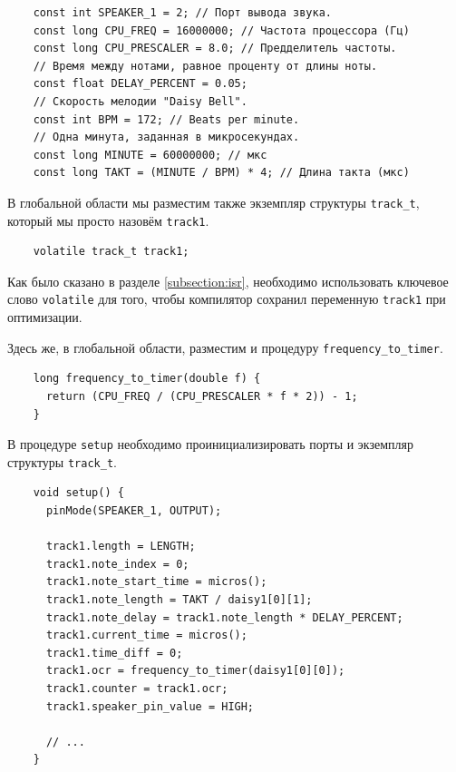 \documentclass[../sparc.tex]{subfiles}
\begin{document}
\begin{listing}[H]
  \begin{verbatim}
    const int SPEAKER_1 = 2; // Порт вывода звука.
    const long CPU_FREQ = 16000000; // Частота процессора (Гц)
    const long CPU_PRESCALER = 8.0; // Предделитель частоты.
    // Время между нотами, равное проценту от длины ноты.
    const float DELAY_PERCENT = 0.05;
    // Скорость мелодии "Daisy Bell".
    const int BPM = 172; // Beats per minute.
    // Одна минута, заданная в микросекундах.
    const long MINUTE = 60000000; // мкс
    const long TAKT = (MINUTE / BPM) * 4; // Длина такта (мкс)
  \end{verbatim}
  \caption{Константы, необходимые для генерации мелодии.}
  \label{listing:mcu-music-4}
\end{listing}

В глобальной области мы разместим также экземпляр структуры
\texttt{track_t}, который мы просто назовём \texttt{track1}.

\begin{listing}[H]
  \begin{verbatim}
    volatile track_t track1;
  \end{verbatim}
  \caption{Создание экземпляра структуры \texttt{track_t}.}
  \label{listing:mcu-music-5}
\end{listing}

Как было сказано в разделе \ref{subsection:isr}, необходимо использовать
ключевое слово \texttt{volatile} для того, чтобы компилятор сохранил
переменную \texttt{track1} при оптимизации.

Здесь же, в глобальной области, разместим и процедуру
\texttt{frequency_to_timer}.

\begin{listing}[H]
  \begin{verbatim}
    long frequency_to_timer(double f) {
      return (CPU_FREQ / (CPU_PRESCALER * f * 2)) - 1;
    }
  \end{verbatim}
  \caption{Процедура для преобразования частоты звука в значение регистра
    сравнения ``OCR''.}
  \label{listing:mcu-music-6}
\end{listing}

В процедуре \texttt{setup} необходимо проинициализировать порты и
экземпляр структуры \texttt{track_t}.

\begin{listing}[H]
  \begin{verbatim}
    void setup() {
      pinMode(SPEAKER_1, OUTPUT);

      track1.length = LENGTH;
      track1.note_index = 0;
      track1.note_start_time = micros();
      track1.note_length = TAKT / daisy1[0][1];
      track1.note_delay = track1.note_length * DELAY_PERCENT;
      track1.current_time = micros();
      track1.time_diff = 0;
      track1.ocr = frequency_to_timer(daisy1[0][0]);
      track1.counter = track1.ocr;
      track1.speaker_pin_value = HIGH;

      // ...
    }
  \end{verbatim}
  \caption{Инициализация цифрового порта и структуры.}
  \label{listing:mcu-music-7}
\end{listing}
\end{document}
